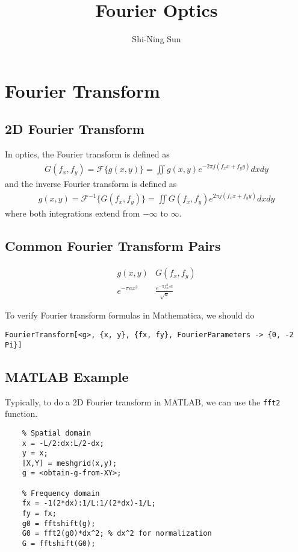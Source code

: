 \documentclass{article}
\begin{document}
\title{Fourier Optics}
\author{Shi-Ning Sun}
\maketitle

\section{Fourier Transform}

\subsection{2D Fourier Transform}

In optics, the Fourier transform is defined as
\begin{align}
    G(f_x, f_y) = \mathcal{F}\{g(x, y)\} = \iint g(x, y) e^{-2\pi j(f_x x + f_y y)} dx dy
\end{align}
and the inverse Fourier transform is defined as
\begin{align}
    g(x, y) = \mathcal{F}^{-1}\{G(f_x, f_y)\} = \iint G(f_x, f_y) e^{2\pi j(f_x x + f_y y)} dx dy
\end{align} 
where both integrations extend from $-\infty$ to $\infty$.

\subsection{Common Fourier Transform Pairs}

$$
\begin{array}{c|c}
    g(x, y) & G(f_x, f_y) \\
    \hline
    e^{-\pi a x^2} & \frac{e^{-\pi f_x^2 / a}}{\sqrt{a}}
\end{array}
$$

To verify Fourier transform formulas in Mathematica, we should do

\begin{verbatim}
FourierTransform[<g>, {x, y}, {fx, fy}, FourierParameters -> {0, -2 Pi}]
\end{verbatim}

\subsection{MATLAB Example}

Typically, to do a 2D Fourier transform in MATLAB, we can use the {\tt fft2} function.
\begin{verbatim}
    % Spatial domain
    x = -L/2:dx:L/2-dx;
    y = x;
    [X,Y] = meshgrid(x,y);
    g = <obtain-g-from-XY>;

    % Frequency domain
    fx = -1(2*dx):1/L:1/(2*dx)-1/L;
    fy = fx;
    g0 = fftshift(g);
    G0 = fft2(g0)*dx^2; % dx^2 for normalization
    G = fftshift(G0);
\end{verbatim}
\end{document}
